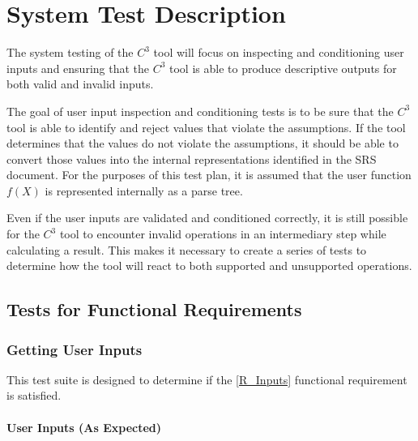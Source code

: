 \documentclass[12pt, titlepage]{article}
\newcommand{\prognameAbbrv}{$C^{3}$}
\begin{document}
\section{System Test Description}
The system testing of the \prognameAbbrv{} tool will focus on inspecting and 
conditioning user inputs and ensuring that the \prognameAbbrv{} tool is able to 
produce descriptive outputs for both valid and invalid inputs. 

The goal of user input inspection and conditioning tests is to be sure that the 
\prognameAbbrv{} tool is able to identify and reject values that violate the 
assumptions. If the tool determines that the values do not violate the 
assumptions, it should be able to convert those values into the internal 
representations identified in the SRS document. For the purposes of this test 
plan, it is assumed that the user function $f(X)$ is represented internally as 
a parse tree.

Even if the user inputs are validated and conditioned correctly, it is still 
possible for the \prognameAbbrv{} tool to encounter invalid operations in an 
intermediary step while calculating a result. This makes it necessary to create 
a series of tests to determine how the tool will react to both supported and 
unsupported operations.
	
\subsection{Tests for Functional Requirements}

\subsubsection{Getting User Inputs}
This test suite is designed to determine if the \ref{R_Inputs} functional 
requirement is satisfied.

\paragraph{User Inputs (As Expected)}
\end{document}
